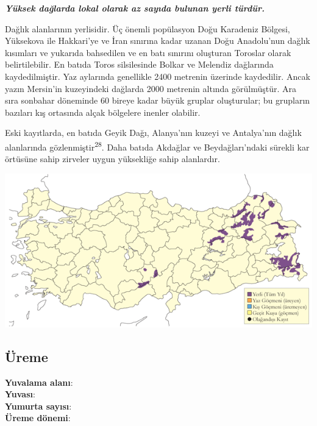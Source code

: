 \documentclass[
  letterpaper,
  DIV=11,
  numbers=noendperiod]{scrreprt}
\begin{document}
\textbf{\emph{Yüksek dağlarda lokal olarak az sayıda bulunan yerli
türdür.}}

Dağlık alanlarının yerlisidir. Üç önemli popülasyon Doğu Karadeniz
Bölgesi, Yüksekova ile Hakkari'ye ve İran sınırına kadar uzanan Doğu
Anadolu'nun dağlık kısımları ve yukarıda bahsedilen ve en batı sınırını
oluşturan Toroslar olarak belirtilebilir. En batıda Toros silsilesinde
Bolkar ve Melendiz dağlarında kaydedilmiştir. Yaz aylarında genellikle
2400 metrenin üzerinde kaydedilir. Ancak yazın Mersin'in kuzeyindeki
dağlarda 2000 metrenin altında görülmüştür. Ara sıra sonbahar döneminde
60 bireye kadar büyük gruplar oluşturular; bu grupların bazıları kış
ortasında alçak bölgelere inenler olabilir.

Eski kayıtlarda, en batıda Geyik Dağı, Alanya'nın kuzeyi ve Antalya'nın
dağlık alanlarında gözlenmiştir\textsuperscript{28}. Daha batıda
Akdağlar ve Beydağları'ndaki sürekli kar örtüsüne sahip zirveler uygun
yüksekliğe sahip alanlardır.

\includegraphics{images/harita_Page_038.png}

\subsection{\texorpdfstring{\textbf{Üreme}}{Üreme}}\label{uxfcreme-2}

\textbf{Yuvalama alanı}:\\
\textbf{Yuvası}:\\
\textbf{Yumurta sayısı}:\\
\textbf{Üreme dönemi}:
\end{document}
